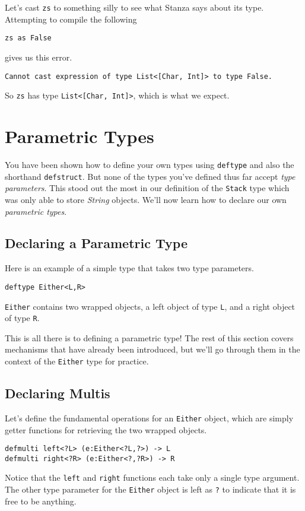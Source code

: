 \documentclass[10pt,oneside]{book}
\begin{document}
Let's cast \texttt{\frenchspacing zs} to something silly to see what Stanza says about its type. Attempting to compile the following
\begin{lstlisting}
zs as False
\end{lstlisting}
gives us this error.
\begin{lstlisting}
Cannot cast expression of type List<[Char, Int]> to type False.
\end{lstlisting}
So \texttt{\frenchspacing zs} has type \texttt{\frenchspacing List<[Char, Int]>}, which is what we expect.

\section{Parametric Types}
You have been shown how to define your own types using \texttt{\frenchspacing deftype} and also the shorthand \texttt{\frenchspacing defstruct}. But none of the types you've defined thus far accept {\em type parameters}. This stood out the most in our definition of the \texttt{\frenchspacing Stack} type which was only able to store {\em String} objects. We'll now learn how to declare our own {\em parametric types}.

\subsection*{Declaring a Parametric Type}
Here is an example of a simple type that takes two type parameters. 
\begin{lstlisting}
deftype Either<L,R>
\end{lstlisting}
\texttt{\frenchspacing Either} contains two wrapped objects, a left object of type \texttt{\frenchspacing L}, and a right object of type \texttt{\frenchspacing R}. 

This is all there is to defining a parametric type! The rest of this section covers mechanisms that have already been introduced, but we'll go through them in the context of the \texttt{\frenchspacing Either} type for practice.

\subsection*{Declaring Multis}
Let's define the fundamental operations for an \texttt{\frenchspacing Either} object, which are simply getter functions for retrieving the two wrapped objects.
\begin{lstlisting}
defmulti left<?L> (e:Either<?L,?>) -> L
defmulti right<?R> (e:Either<?,?R>) -> R
\end{lstlisting}
Notice that the \texttt{\frenchspacing left} and \texttt{\frenchspacing right} functions each take only a single type argument. The other type parameter for the \texttt{\frenchspacing Either} object is left as \texttt{\frenchspacing ?} to indicate that it is free to be anything.
\end{document}
